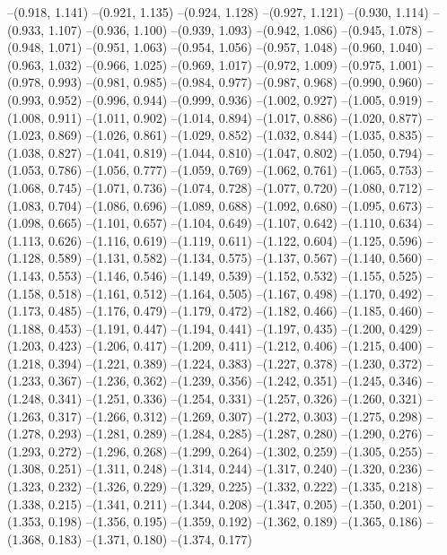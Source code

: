--(0.918, 1.141)
--(0.921, 1.135)
--(0.924, 1.128)
--(0.927, 1.121)
--(0.930, 1.114)
--(0.933, 1.107)
--(0.936, 1.100)
--(0.939, 1.093)
--(0.942, 1.086)
--(0.945, 1.078)
--(0.948, 1.071)
--(0.951, 1.063)
--(0.954, 1.056)
--(0.957, 1.048)
--(0.960, 1.040)
--(0.963, 1.032)
--(0.966, 1.025)
--(0.969, 1.017)
--(0.972, 1.009)
--(0.975, 1.001)
--(0.978, 0.993)
--(0.981, 0.985)
--(0.984, 0.977)
--(0.987, 0.968)
--(0.990, 0.960)
--(0.993, 0.952)
--(0.996, 0.944)
--(0.999, 0.936)
--(1.002, 0.927)
--(1.005, 0.919)
--(1.008, 0.911)
--(1.011, 0.902)
--(1.014, 0.894)
--(1.017, 0.886)
--(1.020, 0.877)
--(1.023, 0.869)
--(1.026, 0.861)
--(1.029, 0.852)
--(1.032, 0.844)
--(1.035, 0.835)
--(1.038, 0.827)
--(1.041, 0.819)
--(1.044, 0.810)
--(1.047, 0.802)
--(1.050, 0.794)
--(1.053, 0.786)
--(1.056, 0.777)
--(1.059, 0.769)
--(1.062, 0.761)
--(1.065, 0.753)
--(1.068, 0.745)
--(1.071, 0.736)
--(1.074, 0.728)
--(1.077, 0.720)
--(1.080, 0.712)
--(1.083, 0.704)
--(1.086, 0.696)
--(1.089, 0.688)
--(1.092, 0.680)
--(1.095, 0.673)
--(1.098, 0.665)
--(1.101, 0.657)
--(1.104, 0.649)
--(1.107, 0.642)
--(1.110, 0.634)
--(1.113, 0.626)
--(1.116, 0.619)
--(1.119, 0.611)
--(1.122, 0.604)
--(1.125, 0.596)
--(1.128, 0.589)
--(1.131, 0.582)
--(1.134, 0.575)
--(1.137, 0.567)
--(1.140, 0.560)
--(1.143, 0.553)
--(1.146, 0.546)
--(1.149, 0.539)
--(1.152, 0.532)
--(1.155, 0.525)
--(1.158, 0.518)
--(1.161, 0.512)
--(1.164, 0.505)
--(1.167, 0.498)
--(1.170, 0.492)
--(1.173, 0.485)
--(1.176, 0.479)
--(1.179, 0.472)
--(1.182, 0.466)
--(1.185, 0.460)
--(1.188, 0.453)
--(1.191, 0.447)
--(1.194, 0.441)
--(1.197, 0.435)
--(1.200, 0.429)
--(1.203, 0.423)
--(1.206, 0.417)
--(1.209, 0.411)
--(1.212, 0.406)
--(1.215, 0.400)
--(1.218, 0.394)
--(1.221, 0.389)
--(1.224, 0.383)
--(1.227, 0.378)
--(1.230, 0.372)
--(1.233, 0.367)
--(1.236, 0.362)
--(1.239, 0.356)
--(1.242, 0.351)
--(1.245, 0.346)
--(1.248, 0.341)
--(1.251, 0.336)
--(1.254, 0.331)
--(1.257, 0.326)
--(1.260, 0.321)
--(1.263, 0.317)
--(1.266, 0.312)
--(1.269, 0.307)
--(1.272, 0.303)
--(1.275, 0.298)
--(1.278, 0.293)
--(1.281, 0.289)
--(1.284, 0.285)
--(1.287, 0.280)
--(1.290, 0.276)
--(1.293, 0.272)
--(1.296, 0.268)
--(1.299, 0.264)
--(1.302, 0.259)
--(1.305, 0.255)
--(1.308, 0.251)
--(1.311, 0.248)
--(1.314, 0.244)
--(1.317, 0.240)
--(1.320, 0.236)
--(1.323, 0.232)
--(1.326, 0.229)
--(1.329, 0.225)
--(1.332, 0.222)
--(1.335, 0.218)
--(1.338, 0.215)
--(1.341, 0.211)
--(1.344, 0.208)
--(1.347, 0.205)
--(1.350, 0.201)
--(1.353, 0.198)
--(1.356, 0.195)
--(1.359, 0.192)
--(1.362, 0.189)
--(1.365, 0.186)
--(1.368, 0.183)
--(1.371, 0.180)
--(1.374, 0.177)
